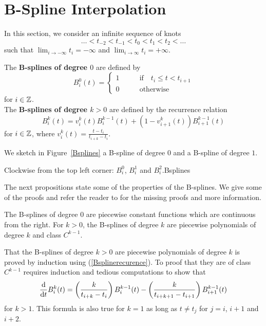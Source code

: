 \section{B-Spline Interpolation} \label{BSI}

In this section, we consider an infinite sequence of knots
\[
\ldots < t_{-2} < t_{-1} < t_0 < t_1 < t_2 < \ldots
\]
such that $\displaystyle \lim_{i\rightarrow -\infty} t_i = -\infty$ and
$\displaystyle \lim_{i\rightarrow \infty} t_i = +\infty$.

\begin{defn}
The {\bfseries B-splines of degree $0$}
are defined by
\[
B_i^0(t) = \begin{cases}
1 & \qquad \text{if} \quad t_i \leq t < t_{i+1} \\
0 & \qquad \text{otherwise}
\end{cases}
\]
for $i\in \ZZ$.\\
The {\bfseries B-splines of degree $k>0$}
are defined by the recurrence relation
\begin{equation}\label{Bsplinerecurence}
B_i^k(t) = v_i^k(t) B_i^{k-1}(t)
+ \left( 1-v_{i+1}^k(t) \right) B_{i+1}^{k-1}(t)
\end{equation}
for $i\in \ZZ$, where
$\displaystyle v_i^k(t) = \frac{t-t_i}{t_{i+k}-t_i}$.
\end{defn}

We sketch in Figure~\ref{Bsplines} a B-spline of degree $0$ and a
B-spline of degree $1$.

{Clockwise from the top left corner: $B_i^0$, $B_i^1$ and $B_i^2$.}{Bsplines}

The next propositions state some of the properties of the B-splines.
We give some of the proofs and refer the reader to \cite{KC} for the
missing proofs and more information.

\begin{prop}
The B-splines of degree $0$ are piecewise constant functions which are
continuous from the right.  For $k>0$, the B-splines of degree $k$ are
piecewise polynomials of degree $k$ and class $C^{k-1}$.
\label{BSplineCkm1}
\end{prop}

That the B-splines of degree $k>0$ are piecewise polynomials of degree
$k$ is proved by induction using (\ref{Bsplinerecurence}).   To proof
that they are of class $C^{k-1}$ requires induction and tedious
computations to show that
\begin{equation}\label{derBspline}
  \dfdx{B_i^k(t)}{t} =
  \left( \frac{k}{t_{i+k}-t_i} \right) B_i^{k-1}(t)
- \left( \frac{k}{t_{i+k+1}-t_{i+1}} \right) B_{i+1}^{k-1}(t)
\end{equation}
for $k>1$.  This formula is also true for $k=1$ as long as $t\neq t_j$
for $j=i$, $i+1$ and $i+2$.

